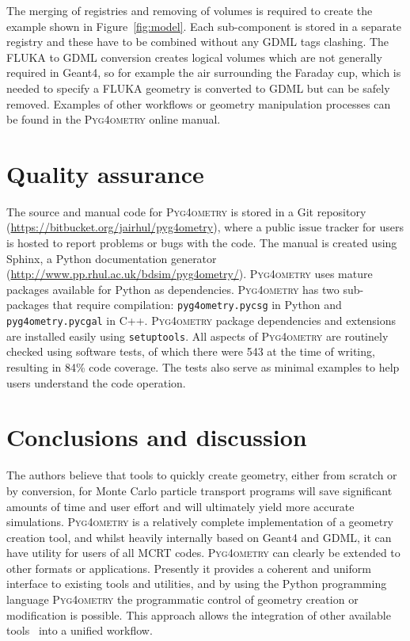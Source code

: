 \documentclass[final,5p,times,twocolumn]{elsarticle}
\newcommand{\pyinline}[1]{\lstinline[postbreak={}]{#1}}
\newcommand{\PYGEOMETRY}{\textsc{Pyg4ometry}}
\begin{document}
The merging of registries and removing of volumes is required to create the example shown in Figure~\ref{fig:model}.
Each sub-component is stored in a separate registry and these have to be combined without any GDML tags clashing.
The FLUKA to GDML conversion creates logical volumes which are not generally required in Geant4, so for example
the air surrounding the Faraday cup, which is needed to specify a FLUKA geometry is converted to GDML but can be
safely removed. Examples of other workflows or geometry manipulation processes can be found in
the \PYGEOMETRY{} online manual.

\section{Quality assurance}
The source and manual code for \PYGEOMETRY{} is stored in a Git repository (\url{https://bitbucket.org/jairhul/pyg4ometry}),
where a public issue tracker for users is hosted to report problems or bugs with the code. The manual is created using Sphinx, a
Python documentation generator (\url{http://www.pp.rhul.ac.uk/bdsim/pyg4ometry/}). \PYGEOMETRY{} uses mature packages
available for Python as dependencies. \PYGEOMETRY{} has  two sub-packages
that require compilation: \pyinline{pyg4ometry.pycsg} in Python and
\pyinline{pyg4ometry.pycgal} in C++.
\PYGEOMETRY{} package dependencies and extensions are installed easily using
\pyinline{setuptools}. All aspects of \PYGEOMETRY{} are routinely checked
using software tests, of which there were 543 at the time of writing,
resulting in 84\% code coverage. The tests also serve as minimal examples to help users understand the code operation.

\section{Conclusions and discussion}
The authors believe that tools to quickly create geometry, either from scratch or by conversion,
for Monte Carlo particle transport programs
will save significant amounts of time and user effort and will ultimately
yield more accurate simulations. \PYGEOMETRY{} is a relatively complete implementation of a geometry
creation tool, and whilst heavily internally based on Geant4 and GDML, it can have utility for users of all MCRT
codes. \PYGEOMETRY{} can clearly be extended to other formats or applications. Presently it provides a coherent and
uniform interface to existing tools and utilities, and by using the Python programming language \PYGEOMETRY{}
 the programmatic control of geometry creation or modification is possible. This approach allows the integration of
other available tools~\cite{DavisNIMA915-65} into a unified workflow.
\end{document}
